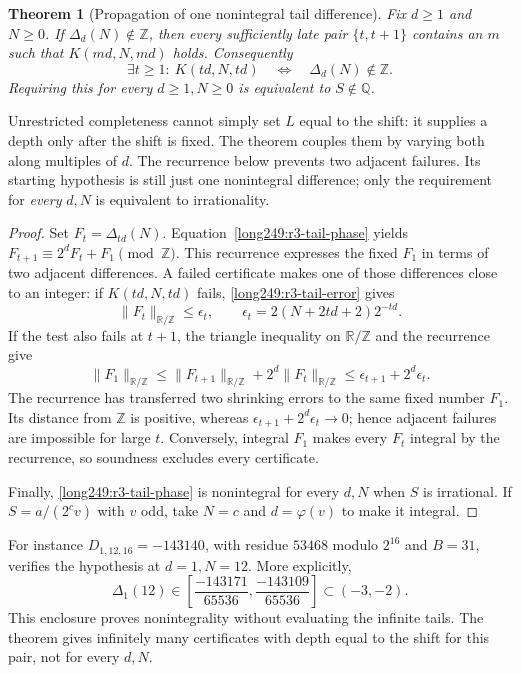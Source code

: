 \documentclass[11pt]{article}
\theoremstyle{plain}
\newtheorem{theorem}[thm]{Theorem}
\theoremstyle{definition}
\theoremstyle{remark}
\newcommand{\Z}{\mathbb{Z}}
\newcommand{\Q}{\mathbb{Q}}
\newcommand{\R}{\mathbb{R}}
\newcommand{\ph}{\varphi}
\begin{document}
\begin{theorem}[Propagation of one nonintegral tail difference]\label{res:fulldepth}
Fix $d\ge1$ and $N\ge0$. If $\Delta_d(N)\notin\Z$, then every sufficiently
late pair $\{t,t+1\}$ contains an $m$ such that $K(md,N,md)$ holds.
Consequently
\[
 \exists t\ge1:\ K(td,N,td)
 \quad\Longleftrightarrow\quad\Delta_d(N)\notin\Z.
\]
Requiring this for every $d\ge1,N\ge0$ is equivalent to $S\notin\Q$.
\end{theorem}
Unrestricted completeness cannot simply set $L$ equal to the shift:
it supplies a depth only after the shift is fixed. The theorem couples
them by varying both along multiples of $d$. The recurrence below
prevents two adjacent failures. Its starting hypothesis is still just
one nonintegral difference; only the requirement for \emph{every}
$d,N$ is equivalent to irrationality.

\begin{proof}
Set $F_t=\Delta_{td}(N)$. Equation~\eqref{long249:r3-tail-phase} yields
$F_{t+1}\equiv2^dF_t+F_1\pmod\Z$. This recurrence expresses the fixed
$F_1$ in terms of two adjacent differences. A failed certificate makes
one of those differences close to an integer: if $K(td,N,td)$ fails,
\eqref{long249:r3-tail-error} gives
\[
 \|F_t\|_{\R/\Z}\le\epsilon_t,
 \qquad \epsilon_t=2(N+2td+2)2^{-td}.
\]
If the test also fails at $t+1$, the triangle inequality on $\R/\Z$
and the recurrence give
\[
 \|F_1\|_{\R/\Z}
 \le \|F_{t+1}\|_{\R/\Z}+2^d\|F_t\|_{\R/\Z}
 \le\epsilon_{t+1}+2^d\epsilon_t.
\]
The recurrence has transferred two shrinking errors to the same
fixed number $F_1$. Its distance from $\Z$ is positive, whereas
$\epsilon_{t+1}+2^d\epsilon_t\to0$; hence adjacent failures are
impossible for large $t$. Conversely, integral $F_1$ makes every
$F_t$ integral by the recurrence, so soundness excludes every certificate.

Finally, \eqref{long249:r3-tail-phase} is
nonintegral for every $d,N$ when $S$ is irrational. If
$S=a/(2^cv)$ with $v$ odd, take $N=c$ and $d=\ph(v)$ to make it integral.
\end{proof}
For instance $D_{1,12,16}=-143140$, with residue $53468$ modulo $2^{16}$
and $B=31$, verifies the hypothesis at $d=1,N=12$. More explicitly,
\[
 \Delta_1(12)\in
 \left[\frac{-143171}{65536},\frac{-143109}{65536}\right]
 \subset(-3,-2).
\]
This enclosure proves nonintegrality without evaluating the infinite
tails. The theorem gives infinitely many certificates with depth equal
to the shift for this pair, not for every $d,N$.
\end{document}
